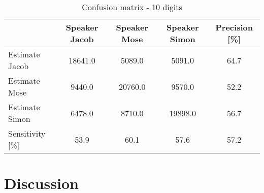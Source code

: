 \begin{table}[H]                                                    
\centering                                                          
\begin{tabular}{|l|c|c|c|c|}                                        
\hline                                                              
  & Speaker Jacob & Speaker Mose & Speaker Simon & Precision [\%] \\
\hline                                                              
Estimate Jacob & 18641.0 & 5089.0 & 5091.0 & 64.7 \\                
\hline                                                              
Estimate Mose & 9440.0 & 20760.0 & 9570.0 & 52.2 \\                 
\hline                                                              
Estimate Simon & 6478.0 & 8710.0 & 19898.0 & 56.7 \\                
\hline                                                              
Sensitivity [\%] & 53.9 & 60.1 & 57.6 & 57.2 \\                     
\hline                                                              
\end{tabular}                                                       
\caption{Confusion matrix - 10 digits}                              
\label{table:PGM_conf_10}                                           
\end{table}

\section{Discussion}
